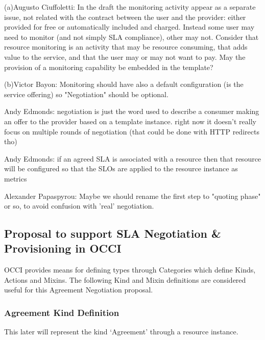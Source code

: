 \documentclass[12pt]{article}  %
\begin{document}
{
\color{blue}

(a)Augusto Ciuffoletti:
In the draft the monitoring activity appear as a separate issue, not related with the contract between the user and the provider: either provided for free or automatically included and charged. Instead some user may need to monitor (and not simply SLA compliance), other may not. Consider that resource monitoring is an activity that may be resource consuming, that adds value to the service, and that the user may or may not want to pay. May the provision of a monitoring capability be embedded in the template?



(b)Victor Bayon:
Monitoring should have also a default configuration (is the service offering) so "Negotiation" should be optional.



Andy Edmonds:
negotiation is just the word used to describe a consumer making an offer to the provider based on a template instance. right now it doesn't really focus on multiple rounds of negotiation (that could be done with HTTP redirects tho)



Andy Edmonds:
if an agreed SLA is associated with a resource then that resource will be configured so that the SLOs are applied to the resource instance as metrics



Alexander Papaspyrou:
Maybe we should rename the first step to "quoting phase" or so, to avoid confusion with 'real' negotiation.
}

\subsection{Proposal to support SLA Negotiation \& Provisioning in OCCI}

OCCI provides means for defining types through Categories which define Kinds, Actions and Mixins. The following Kind and Mixin definitions are considered useful for this Agreement Negotiation proposal.

\subsubsection{Agreement Kind Definition}

This later will represent the kind ‘Agreement’ through a resource instance.
\end{document}
